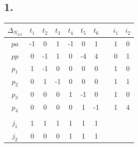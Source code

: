 \documentclass[12pt, paper=a4]{article}
\begin{document}
\subsection*{1.}
\begin{tabular}{ | c | c c c c c c | c | c | c |}
	\hline
	$\Delta_{N_{LS}}$ & $t_1$ & $t_2$ & $t_3$ & $t_4$ & $t_5$ & $t_6$ & \hspace*{10pt} & $i_1$ & $i_2$\\
	\hline
	$pa$ & -1 & 0 & 1 & -1 & 0 & 1 & & 1 & 0\\
	$pp$ & 0 & -1 & 1 & 0 & -4 & 4 & & 0 & 1\\
	$p_1$ & 1 & -1 & 0 & 0 & 0 & 0 & & 1 & 0\\
	$p_2$ & 0 & 1 & -1 & 0 & 0 & 0 & & 1 & 1\\
	$p_3$ & 0 & 0 & 0 & 1 & -1 & 0 & & 1 & 0\\
	$p_4$ & 0 & 0 & 0 & 0 & 1 & -1 & & 1 & 4\\
	\hline
	& & & & & &\\ \cline{1-7}
	$j_1$ & 1 & 1 & 1 & 1 & 1 & 1\\
	$j_2$ & 0 & 0 & 0 & 1 & 1 & 1\\
	\cline{1-7}
\end{tabular}
\\
\end{document}
